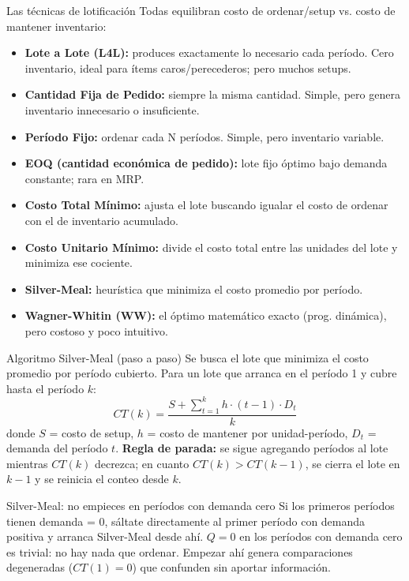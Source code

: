 \begin{definicion}{Las técnicas de lotificación}
   Todas equilibran costo de ordenar/setup vs. costo de mantener inventario:
   \begin{itemize}
     \item \textbf{Lote a Lote (L4L):} produces exactamente lo necesario cada período. Cero inventario, ideal para ítems caros/perecederos; pero muchos setups.
     \item \textbf{Cantidad Fija de Pedido:} siempre la misma cantidad. Simple, pero genera inventario innecesario o insuficiente.
     \item \textbf{Período Fijo:} ordenar cada N períodos. Simple, pero inventario variable.
     \item \textbf{EOQ (cantidad económica de pedido):} lote fijo óptimo bajo demanda constante; rara en MRP.
     \item \textbf{Costo Total Mínimo:} ajusta el lote buscando igualar el costo de ordenar con el de inventario acumulado.
     \item \textbf{Costo Unitario Mínimo:} divide el costo total entre las unidades del lote y minimiza ese cociente.
     \item \textbf{Silver-Meal:} heurística que minimiza el costo promedio por período.
     \item \textbf{Wagner-Whitin (WW):} el óptimo matemático exacto (prog. dinámica), pero costoso y poco intuitivo.
   \end{itemize}
\end{definicion}

\begin{formulas}{Algoritmo Silver-Meal (paso a paso)}
   Se busca el lote que minimiza el costo promedio por período cubierto. Para un lote que arranca en el período 1 y cubre hasta el período $k$:
   $$CT(k) = \frac{S + \sum_{t=1}^{k} h \cdot (t - 1) \cdot D_t}{k}$$
   donde $S$ = costo de setup, $h$ = costo de mantener por unidad-período, $D_t$ = demanda del período $t$. 
   \textbf{Regla de parada:} se sigue agregando períodos al lote mientras $CT(k)$ decrezca; en cuanto $CT(k) > CT(k - 1)$, se cierra el lote en $k - 1$ y se reinicia el conteo desde $k$.
\end{formulas}

\begin{trampa}{Silver-Meal: no empieces en períodos con demanda cero}
   Si los primeros períodos tienen demanda = 0, sáltate directamente al primer período con demanda positiva y arranca Silver-Meal desde ahí. $Q = 0$ en los períodos con demanda cero es trivial: no hay nada que ordenar. Empezar ahí genera comparaciones degeneradas ($CT(1) = 0$) que confunden sin aportar información.
\end{trampa}

